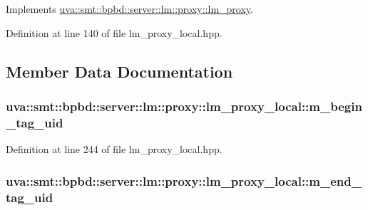 Implements \hyperlink{classuva_1_1smt_1_1bpbd_1_1server_1_1lm_1_1proxy_1_1lm__proxy_a6b1f23d2007cf4c44e812ac037ac8fe8}{uva\+::smt\+::bpbd\+::server\+::lm\+::proxy\+::lm\+\_\+proxy}.



Definition at line 140 of file lm\+\_\+proxy\+\_\+local.\+hpp.



\subsection{Member Data Documentation}
\hypertarget{classuva_1_1smt_1_1bpbd_1_1server_1_1lm_1_1proxy_1_1lm__proxy__local_adf9f94e10e1d210e35c7716b08b89977}{}
\subsubsection[{m\+\_\+begin\+\_\+tag\+\_\+uid}]{ uva\+::smt\+::bpbd\+::server\+::lm\+::proxy\+::lm\+\_\+proxy\+\_\+local\+::m\+\_\+begin\+\_\+tag\+\_\+uid\hspace{0.3cm}{\ttfamily [protected]}}\label{classuva_1_1smt_1_1bpbd_1_1server_1_1lm_1_1proxy_1_1lm__proxy__local_adf9f94e10e1d210e35c7716b08b89977}


Definition at line 244 of file lm\+\_\+proxy\+\_\+local.\+hpp.

\hypertarget{classuva_1_1smt_1_1bpbd_1_1server_1_1lm_1_1proxy_1_1lm__proxy__local_a656493c20699367286febb880cbf1ca1}{}
\subsubsection[{m\+\_\+end\+\_\+tag\+\_\+uid}]{ uva\+::smt\+::bpbd\+::server\+::lm\+::proxy\+::lm\+\_\+proxy\+\_\+local\+::m\+\_\+end\+\_\+tag\+\_\+uid\hspace{0.3cm}{\ttfamily [protected]}}\label{classuva_1_1smt_1_1bpbd_1_1server_1_1lm_1_1proxy_1_1lm__proxy__local_a656493c20699367286febb880cbf1ca1}


